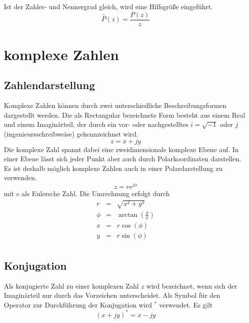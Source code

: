 
Ist der Zahler- und Nennergrad gleich, wird eine Hilfsgröße
eingeführt.
\begin{equation}\label{eq:Anhang:PolyHild}
    \widehat{P}(z) = \frac{P(z)}{z}
\end{equation}


\section{komplexe Zahlen}
\subsection{Zahlendarstellung}
Komplexe Zahlen können durch zwei unterschiedliche
Beschreibungsformen dargestellt werden. Die als Rectangular
bezeichnete Form besteht aus einem Real und einem Imaginärteil,
der durch ein vor- oder nachgestelltes $i= \sqrt{-1}$ oder $j$
(ingenieursschreibweise) gekennzeichnet wird.
\begin{equation}\label{eq:KOmplexDef}
    z = x + jy
\end{equation}
Die komplexe Zahl spannt dabei eine zweidimensionale komplexe
Ebene auf. In einer Ebene lässt sich jeder Punkt aber auch durch
Polarkoordinaten darstellen. Es ist deshalb möglich komplexe
Zahlen auch in einer Polardarstellung zu verwenden.
\begin{equation}\label{eq:KomplexeZahlenPolardarstellung}
    z = r e^{j\phi}
\end{equation}
mit $e$ als Eulersche Zahl. Die Umrechnung erfolgt durch
\begin{eqnarray}\label{eq:UmrechnungPolarRect}
    r &=& \sqrt{x^2 + y^2} \\
    \phi &=& \arctan \left(\frac{y}{x} \right)\\
    x &=& r \cos (\phi)\\
    y &=& r \sin (\phi)\\
\end{eqnarray}
\subsection{Konjugation}
Als konjugierte Zahl zu einer komplexen Zahl $z$ wird bezeichnet,
wenn sich der Imaginärteil nur durch das Vorzeichen unterscheidet.
Als Symbol für den Operator zur Durchführung der Konjugation wird
$^{\ast}$ verwendet. Es gilt
\begin{equation}\label{eq:Def:Konjugation}
    (x+jy)^{\ast} = x-jy
\end{equation}


